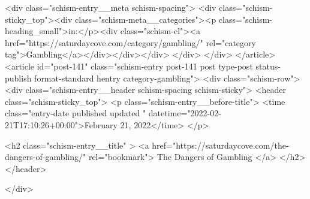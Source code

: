 {		<div class="schism-entry__meta schism-spacing">			<div class="schism-sticky_top"><div class="schism-meta__categories"><p class="schism-heading_small">in:</p><div class="schism-cl"><a href="https://saturdaycove.com/category/gambling/" rel="category tag">Gambling</a></div></div></div>		</div>
	</div>
</article>
<article id="post-141" class="schism-entry post-141 post type-post status-publish format-standard hentry category-gambling">
	<div class="schism-row">		<div class="schism-entry__header schism-spacing schism-sticky">			<header class="schism-sticky_top">				<p class="schism-entry__before-title">
					<time class="entry-date published updated " datetime="2022-02-21T17:10:26+00:00">February 21, 2022</time>				</p>

				<h2 class="schism-entry__title" >
					<a href="https://saturdaycove.com/the-dangers-of-gambling/" rel="bookmark">
						The Dangers of Gambling					</a>
				</h2>
			</header>

					</div>

}
